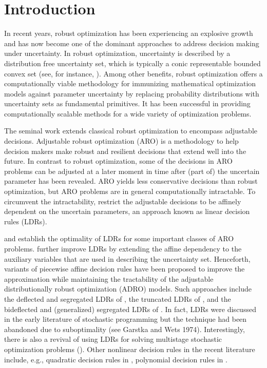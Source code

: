\documentclass[fleqn,orsc,blindrev]{informs4}
\begin{document}
\maketitle
	
\section{Introduction}
\noindent In recent years, robust optimization has been experiencing an explosive growth and has now become one of the dominant approaches to address decision making under uncertainty. In robust optimization, uncertainty is described by a distribution free uncertainty set, which is typically a conic representable bounded convex set (see, for instance, \cite{gl97,gol98,bn98,bn99,bn00,bs04,bb09,bbc11}). Among other benefits, robust optimization offers a computationally viable methodology for immunizing mathematical optimization models against parameter uncertainty by\vadjust{\pagebreak} replacing probability distributions with uncertainty sets as fundamental primitives. It has been successful in providing computationally scalable methods for a wide variety of optimization problems. 
	
	The seminal work \cite{bggn04} extends classical robust optimization to encompass adjustable decisions.  {Adjustable robust optimization (ARO) is a methodology to help decision makers make robust and resilient decisions that extend well into the future. In contrast to robust optimization, some of the decisions in ARO problems can be adjusted at a later moment in time after (part of) the uncertain parameter has been revealed. ARO yields less conservative decisions than robust optimization, but ARO problems} are in general computationally intractable. To circumvent the intractability, \cite{bggn04} restrict the adjustable decisions to be affinely dependent on the uncertain parameters, an approach known as linear decision rules (LDRs). 
	
	\cite{bip10,iss13} and \cite{bg12} establish the optimality of LDRs for some important classes of ARO problems. \cite{cz09} further improve LDRs by extending the affine dependency to the auxiliary variables that are used in describing the uncertainty set. Henceforth, variants of piecewise affine decision rules have been proposed to improve the approximation while maintaining the tractability of the adjustable distributionally robust optimization (ADRO) models. Such approaches include the deflected and segregated LDRs of \cite{cssz08}, the truncated LDRs of \cite{ss09}, and the bideflected and (generalized) segregated LDRs of \cite{gs10}. In fact, LDRs were discussed in the early literature of stochastic programming but the technique had been abandoned due to suboptimality (see Garstka and Wets 1974). Interestingly, there is also a revival of using LDRs for solving multistage stochastic optimization problems (\cite{kwg11}). Other nonlinear decision rules in the recent literature include, e.g., quadratic decision rules in \cite{ben09}, polynomial decision rules in \cite{bip11}.
	
\end{document}
